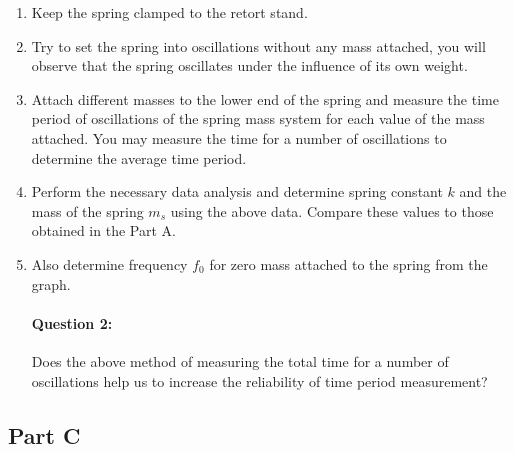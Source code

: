 \begin{enumerate}
\item Keep the spring clamped to the retort stand.

\item Try to set the spring into oscillations without any mass attached, you will observe that
the spring oscillates under the influence of its own weight.

\item Attach different masses to the lower end of the spring and measure the time period of oscillations of the spring mass system for each value of the mass attached. You may measure the time for a number of oscillations to determine the average time period.

\item Perform the necessary data analysis and determine spring constant $k$ and the mass of the spring $m_s$ using the above data. Compare these values to those obtained in the Part A.

\item Also determine frequency $f_0$ for zero mass attached to the spring from the graph.


\paragraph{Question 2:} Does the above method of measuring the total time for a number of oscillations help us to increase the reliability of time period measurement?
\end{enumerate}


\subsection*{Part C}

